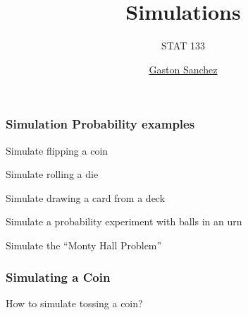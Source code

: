 \documentclass[12pt]{beamer}\usepackage[]{graphicx}\usepackage[]{color}
\title{Simulations}
\subtitle{STAT 133}
\author{\href{http://www.gastonsanchez.com}{Gaston Sanchez}}
\institute{\href{https://github.com/ucb-stat133/stat133-fall-2016}{\tt \scriptsize \color{foreground} github.com/ucb-stat133/stat133-fall-2016}}
\date{}
\begin{document}
{
  \frame{
    \titlepage
  } 
}


\begin{frame}
\begin{center}
\Huge{}
\end{center}
\end{frame}


\begin{frame}
\begin{center}
\Huge{}
\end{center}
\end{frame}


\begin{frame}
\frametitle{Simulation Probability examples}

\bbi
  \item Simulate flipping a coin
  \item Simulate rolling a die
  \item Simulate drawing a card from a deck
  \item Simulate a probability experiment with balls in an urn
  \item Simulate the ``Monty Hall Problem''
\ei
\eb

\end{frame}


\begin{frame}
\begin{center}
\Huge{}
\end{center}
\end{frame}


\begin{frame}
\frametitle{Simulating a Coin}

How to simulate tossing a coin?

\begin{center}
\end{center}

\end{frame}
\end{document}

